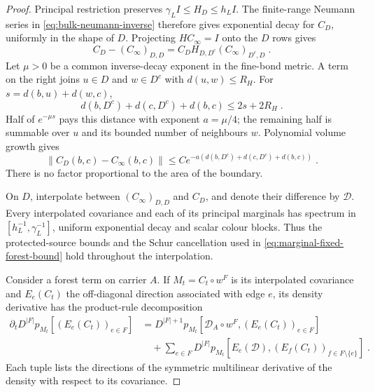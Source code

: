 \documentclass[11pt]{article}
\begin{document}
\begin{proof}
Principal restriction preserves $\gamma_L I\leq H_D\leq h_L I$. The finite-range Neumann series in \eqref{eq:bulk-neumann-inverse} therefore gives exponential decay for $C_D$, uniformly in the shape of $D$. Projecting $HC_\infty=I$ onto the $D$ rows gives
\begin{equation}\label{eq:regional-resolvent}
    C_D-(C_\infty)_{D,D}
        =C_DH_{D,D^c}(C_\infty)_{D^c,D}\;.
\end{equation}
Let $\mu>0$ be a common inverse-decay exponent in the fine-bond metric. A term on the right joins $u\in D$ and $w\in D^c$ with $d(u,w)\leq R_H$. For $s=d(b,u)+d(w,c)$,
\begin{equation}
    d(b,D^c)+d(c,D^c)+d(b,c)\leq 2s+2R_H\;.
\end{equation}
Half of $e^{-\mu s}$ pays this distance with exponent $a=\mu/4$; the remaining half is summable over $u$ and its bounded number of neighbours $w$. Polynomial volume growth gives
\begin{equation}\label{eq:regional-covariance-difference}
    \|C_D(b,c)-C_\infty(b,c)\|
        \leq C e^{-a(d(b,D^c)+d(c,D^c)+d(b,c))}\;.
\end{equation}
There is no factor proportional to the area of the boundary.

On $D$, interpolate between $(C_\infty)_{D,D}$ and $C_D$, and denote their difference by $\mathcal D$. Every interpolated covariance and each of its principal marginals has spectrum in $[h_L^{-1},\gamma_L^{-1}]$, uniform exponential decay and scalar colour blocks. Thus the protected-source bounds and the Schur cancellation used in \eqref{eq:marginal-fixed-forest-bound} hold throughout the interpolation.

Consider a forest term on carrier $A$. If $M_t=C_t\circ w^F$ is its interpolated covariance and $E_e(C_t)$ the off-diagonal direction associated with edge $e$, its density derivative has the product-rule decomposition
\begin{equation}\label{eq:regional-density-derivative}
    \begin{aligned}
        \partial_t D^{|F|}p_{M_t}[(E_e(C_t))_{e\in F}]
            &=D^{|F|+1}p_{M_t}
                [\mathcal D_A\circ w^F,(E_e(C_t))_{e\in F}]\\
            &\quad+\sum_{e\in F}D^{|F|}p_{M_t}
                [E_e(\mathcal D),(E_f(C_t))_{f\in F\setminus\{e\}}]\;.
    \end{aligned}
\end{equation}
Each tuple lists the directions of the symmetric multilinear derivative of the density with respect to its covariance.


\end{proof}
\end{document}
